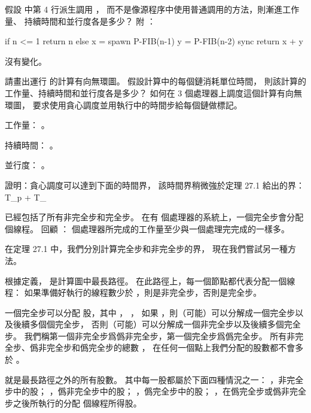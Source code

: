 
\startsection[
  title={The basics of dynamic multithreading},
]

\startEXERCISE
假設  中第 4 行派生調用 ，
而不是像源程序中使用普通調用的方法，則漸進工作量、
持續時間和並行度各是多少？
附 ：

\startCLRS
if n <= 1
	return n
else
	x = spawn P-FIB(n-1)
	y = P-FIB(n-2)
	sync
	return x + y
\stopCLRS
\stopEXERCISE

\startANSWER
沒有變化。
\stopANSWER

\startEXERCISE
請畫出運行  的計算有向無環圖。
假設計算中的每個鏈消耗單位時間，
則該計算的工作量、持續時間和並行度各是多少？
如何在 3 個處理器上調度這個計算有向無環圖，
要求使用貪心調度並用執行中的時間步給每個鏈做標記。
\stopEXERCISE

\startANSWER
工作量： 。

持續時間： 。

並行度： 。

\externalfigure[output/e27_1_2-1][factor=fit]
\stopANSWER

\startEXERCISE[exercise:27.1-3]
證明：貪心調度可以達到下面的時間界，
該時間界稍微強於定理 27.1 給出的界：
\startformula
T_p \le {} + T_{\infty}
\stopformula
\stopEXERCISE

\startANSWER
{} 已經包括了所有非完全步和完全步。
在有  個處理器的系統上，一個完全步會分配  個線程。
回顧 ：  個處理器所完成的工作量至少與一個處理完完成的一樣多。

在定理 27.1 中，我們分別計算完全步和非完全步的界，
現在我們嘗試另一種方法。

根據定義，  是計算圖中最長路徑。
在此路徑上，每一個節點都代表分配一個線程：
如果準備好執行的線程數少於 ，則是非完全步，否則是完全步。

一個完全步可以分配  股，其中 ， ，
如果 ，則（可能）可以分解成一個完全步以及後續多個個完全步，
否則（可能）可以分解成一個非完全步以及後續多個完全步。
我們稱第一個非完全步爲{\EMP 僞}非完全步，第一個完全步爲{\EMP 僞}完全步。
所有非完全步、僞非完全步和僞完全步的總數 ，
在任何一個點上我們分配的股數都不會多於 。

 就是最長路徑之外的所有股數。
其中每一股都屬於下面四種情況之一：
 ，非完全步中的股；
 ，僞非完全步中的股；
 ，僞完全步中的股；
 ，在僞完全步或僞非完全步之後所執行的分配  個線程所得股。

